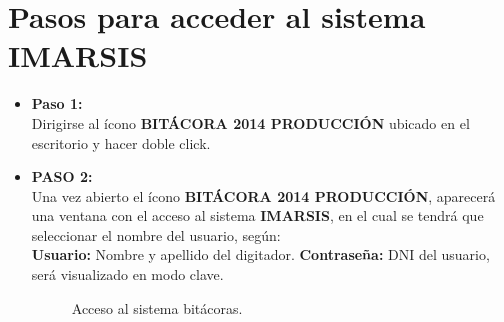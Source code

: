 \documentclass[a4paper,oneside,11pt]{book}
\begin{document}
\section {Pasos para acceder al sistema IMARSIS}

\begin{itemize}
\item\textbf{Paso 1:}\\
Dirigirse al ícono \textbf{BITÁCORA 2014 PRODUCCIÓN} ubicado en el escritorio y hacer doble click.
\item\textbf{PASO 2:} \\
Una vez abierto el ícono \textbf{BITÁCORA 2014 PRODUCCIÓN}, aparecerá una ventana con el acceso al sistema \textbf{IMARSIS}, en el cual se tendrá que seleccionar el nombre del usuario, según:\\
\subitem\textbf{Usuario:} Nombre y apellido del digitador.
\subitem\textbf{Contraseña:} DNI del usuario, será visualizado en modo clave.
\begin{figure}[htbp]
\centering
{}
\caption{Acceso al sistema bitácoras.}
\vspace{-10pt}
\end{figure}


\end{itemize}
\end{document}
